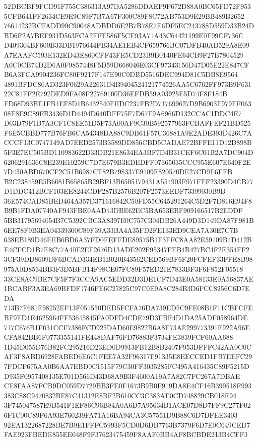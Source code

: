 \documentclass[UTF8,fontset=fandol,zihao=-4,a4paper]{ctexart}
\begin{document}
{{52DBCBF9FCD91F755C386313A97DA5286DDAEF9F672D88A0BC65FD72F9535CFB641FF2634CE9E9C89F7B7A67F300C89F8C72AB753D9E29BB489B2652
76614232BCFADD99C90048ADBDD6E2B7B78E7E6DF5EC243788D559D33B24DBD6F2A7BEF931D563FCA2EFF586F5CE93A71A43C64421199E0F99CF736C
D409304BF600B33DB1976644FB34AE1EB4CF659766BC07DFB40AB529A8E09A7EAAFC593E132ED43E860CFF43FE5CD23B9B0140FE64CB9F27B7804529
A0C0CB74D2D6A0F9857448F5D59D668046E03CF97343156D47D05E22E847CFB6A3FCA9904236FC80F9217F147E90C0DBD5516DEC994D81C5DB8E9564
4891BFDC80AD323F0629A22631D4B9404524121774526AA5C6762FF973B9F63122C81FF2E792DED9FA08F22769100D36EFDB59A03925E5D74F8F184B
FD68D93BE1FB4EF8D1B6432540FEDC237FB2D717699627D9B6903F979FF06308E8E9C89FB3436D1D4494D640DFF75F7D67F9A6966D132CCAC1DDC4E7
D03D79F1B7A3CF1C8EE51D5F73A00AF9C30B592577963FCBAFFEF21BD525F6E5CBBD777B76FB6CA54348DA88C9DB61F57C36881A9E2ADE393D426C7A
CCCF13C0747149AD7EED2573B3589DD856CBD5CADAE72BFFE11D12D898B5F3E7EC505BD110983622D33DB21E8634EA3BF7D4B31CEF6C01B2A7DC904D
6206291636C8E239E10259C7D7E679B3EDEDFF07365035CCC955E607E640F2E7D450ABD670CF2C51B6987CF82B798337E9109E820570DE27CD9E6FFB
B2C238459E5B6081B65865B29BF13B6505179431A554903F971FEF23390D4CB77D1DDC412BCF103EE8244CDF287B2576B207F2573EEDF73399030B9B
36E574CAD85BED464A357D371616842C50FD55C645291264C5D2F7D816E94F8B9B1FDA07740AF943FBE0AAD43DBE62EC5BA653EBF909166517B2EDDF
5BB31795694054B7C5392CBC3A8397E0C757C304DB26A449D3D149DA87F981B6EE78F9B3EA04339300C89F39A33BA4A35FD2FE133ED9CEA7A30E7C7B
638EB189D46EEB6BD6A37FD0FEFFDE89575B1F3FFC8AA82E59109B4D412BE4CFCD1B7E8C77A40E2EF2676D13ADE202F95347FEB4B427BC4F2E354FF2
3CF39DD8609DF6BCAD334EB1B020B43562CED569BF6F20FCFEF33FFE8B98975A0D8534BB3F3D5BFB14F98CE07FC89F57ED21E7833BF3F6F852F05518
33CE8AC9BE7CF5F7F3CCA9AC5EDD32D3DE1CF7D43E0A58133E0A56837AE1BCABF3A3EA69BFDF1746FE6C27825C97C0E9A8C284B3D6FCC8256C6D7EDA
713B7F681F98252EF13F051550DED5FCFA76DA739ED5C9FE08B1F11CBFCFEBF9ED1E4625964FF53645845FA0DFD4CDE79D3FBF4D1DA25ADF058964DE
717C676B1F031CCF7386FCD925DAD60E9822B6A8F73AE299773391E922A96ECFA842BB6F0773355141FE448DAF76FD76883F3734FE3839FCF60AA688
1D45D055D76B82FC295216D23ED0D9913FB12B8B2407F953DFFFC42AA0C0CAF3F8ABD6928FABED6E6C1FEE7A32F96317F91335E8EECCED1FB7EEFC29
7FDCF675AA0B6AA7EBD0C1515F79C30FF3035285FC495A416435C89F5215DD935F0957408135E701D566D43D68A9B3F4600A19A7A82C7FC267A7DBAE
CE8FAA87FCB9DC059D7729BB3FE0F1673B9B0F919DA8E4CF16B399518F993383C88C9470832BF87C41312E8BF2B610CC3C383AF0CD748829CB018E94
3F745047587E9B541F1EF86C96B84A0A6D7A95634B1ACE07D8D7FF9C277F026F1C00C89F6A93E760239FA71A16BA94CA3C57551D9B88C6D7DFEE3403
92EA1322687228BE7B9E1FFFC5993F5CD0D6DB7763B7379F6D7E0C649CED7FAE923FBEDE855EE048F9F37623475459F8AAF0BB4AF8BCBDE213B4CFF3
}}
\end{document}
